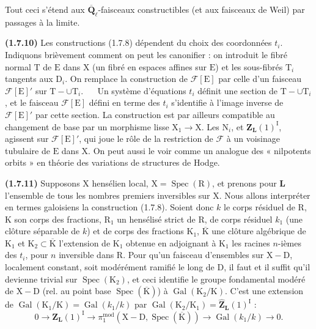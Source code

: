 \documentclass[11pt,leqno]{article}
\newcommand{\Page}[1]{\ifvmode\noindent\else\unskip\ \fi{\footnotesize\textcolor{gray}{[p.\,#1]}}\ \ignorespaces}
\begin{document}
Tout ceci s’étend aux \(\overline{\mathbf{Q}}_\ell\)-faisceaux constructibles (et aux faisceaux de Weil) par passages à la limite.

\textbf{(1.7.10)} Les constructions (1.7.8) dépendent du choix des coordonnées \(t_i\). Indiquons brièvement comment on peut les canonifier : on introduit le fibré normal \(\mathrm{T}\) de \(\mathrm{E}\) dans \(\mathrm{X}\) (un fibré en espaces affines sur \(\mathrm{E}\)) et les sous-fibrés \(\mathrm{T}_i\) tangents aux \(\mathrm{D}_i\). On remplace la construction de \(\mathscr{F}[\mathrm{E}]\) par celle d’un faisceau \(\mathscr{F}[\mathrm{E}]'\) sur \(\mathrm{T}-\cup\mathrm{T}_i\).
\Page{174}
Un système d’équations \(t_i\) définit une section de \(\mathrm{T}-\cup\mathrm{T}_i\), et le faisceau \(\mathscr{F}[\mathrm{E}]\) défini en terme des \(t_i\) s’identifie à l’image inverse de \(\mathscr{F}[\mathrm{E}]'\) par cette section. La construction est par ailleurs compatible au changement de base par un morphisme lisse \(\mathrm{X}_1\to\mathrm{X}\). Les \(\mathrm{N}_i\), et \(\mathbf{Z}_{\mathbf{L}}(1)^{\mathrm{I}}\), agissent sur \(\mathscr{F}[\mathrm{E}]'\), qui joue le rôle de la restriction de \(\mathscr{F}\) à un voisinage tubulaire de \(\mathrm{E}\) dans \(\mathrm{X}\). On peut aussi le voir comme un analogue des « nilpotents orbits » en théorie des variations de structures de Hodge.

\textbf{(1.7.11)} Supposons \(\mathrm{X}\) hensélien local, \(\mathrm{X}=\operatorname{Spec}(\mathrm{R})\), et prenons pour \(\mathbf{L}\) l’ensemble de tous les nombres premiers inversibles sur \(\mathrm{X}\). Nous allons interpréter en termes galoisiens la construction (1.7.8). Soient donc \(k\) le corps résiduel de \(\mathrm{R}\), \(\mathrm{K}\) son corps des fractions, \(\mathrm{R}_1\) un hensélisé strict de \(\mathrm{R}\), de corps résiduel \(k_1\) (une clôture séparable de \(k\)) et de corps des fractions \(\mathrm{K}_1\), \(\overline{\mathrm{K}}\) une clôture algébrique de \(\mathrm{K}_1\) et \(\mathrm{K}_2\subset\overline{\mathrm{K}}\) l’extension de \(\mathrm{K}_1\) obtenue en adjoignant à \(\mathrm{K}_1\) les racines \(n\)-ièmes des \(t_i\), pour \(n\) inversible dans \(\mathrm{R}\). Pour qu’un faisceau d’ensembles sur \(\mathrm{X}-\mathrm{D}\), localement constant, soit modérément ramifié le long de \(\mathrm{D}\), il faut et il suffit qu’il devienne trivial sur \(\operatorname{Spec}(\mathrm{K}_2)\), et ceci identifie le groupe fondamental modéré de \(\mathrm{X}-\mathrm{D}\) (rel. au point base \(\operatorname{Spec}(\overline{\mathrm{K}})\)) à \(\operatorname{Gal}(\mathrm{K}_2/\mathrm{K})\). C’est une extension de \(\operatorname{Gal}(\mathrm{K}_1/\mathrm{K})=\operatorname{Gal}(k_1/k)\) par \(\operatorname{Gal}(\mathrm{K}_2/\mathrm{K}_1)=\widehat{\mathbf{Z}}_{\mathbf{L}}(1)^{\mathrm{I}}\) :
\[
0\to\mathbf{Z}_{\mathbf{L}}(1)^{\mathrm{I}}
\to\pi_1^{\mathrm{mod}}(\mathrm{X}-\mathrm{D},\operatorname{Spec}(\overline{\mathrm{K}}))
\to\operatorname{Gal}(k_1/k)\to0.
\]
\end{document}
